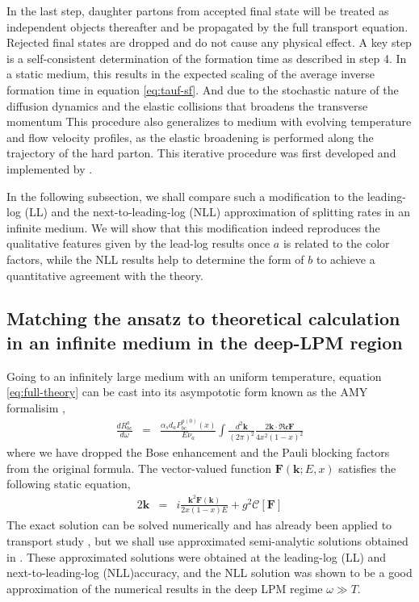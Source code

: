 \documentclass[aps, prc, reprint, amsmath, groupedaddress, nofootinbib]{revtex4-1}
\begin{document}
In the last step, daughter partons from accepted final state will be treated as independent objects thereafter and be propagated by the full transport equation.
Rejected final states are dropped and do not cause any physical effect. 
A key step is a self-consistent determination of the formation time as described in step 4. 
In a static medium, this results in the expected scaling of the average inverse formation time in equation \ref{eq:tauf-sf}.
And due to the stochastic nature of the diffusion dynamics and the elastic collisions that broadens the transverse momentum
This procedure also generalizes to medium with evolving temperature and flow velocity profiles, as the elastic broadening is performed along the trajectory of the hard parton.
This iterative procedure was first developed and implemented by \cite{Zapp:2011ya}.

In the following subsection, we shall compare such a modification to the leading-log (LL) and the next-to-leading-log (NLL) approximation of splitting rates in an infinite medium. 
We will show that this modification indeed reproduces the qualitative features given by the lead-log results once $a$ is related to the color factors, while the NLL results help to determine the form of $b$ to achieve a quantitative agreement with the theory.

\subsection{Matching the ansatz to theoretical calculation in an infinite medium in the deep-LPM region}
Going to an infinitely large medium with an uniform temperature, equation \ref{eq:full-theory} can be cast into its asympototic form known as the AMY formalisim \cite{Arnold:2002ja,Arnold:2002zm,Arnold:2003zc},
\begin{eqnarray}\label{eq:AMY-1}
\frac{dR^a_{bc}}{d\omega} &=& \frac{\alpha_s d_a P^{a(0)}_{bc}(x)}{E\nu_a} \int\frac{d^2\mathbf{k}}{(2\pi)^2} \frac{2\mathbf{k}\cdot \mathfrak{Re} \mathbf{F}}{4x^2(1-x)^2}
\end{eqnarray}
where we have dropped the Bose enhancement and the Pauli blocking factors from the original formula.
The vector-valued function $\mathbf{F}(\mathbf{k}; E, x)$ satisfies the following static equation,
\begin{eqnarray}\label{eq:AMY-2}
2\mathbf{k} &=& i\frac{\mathbf{k}^2 \mathbf{F}(\mathbf{k})}{2x(1-x)E} + g^2 \mathcal{C}[\mathbf{F}]
\end{eqnarray} 
The exact solution can be solved numerically and has already been applied to transport study \cite{Jeon:2003gi,Schenke:2009gb}, but we shall use approximated semi-analytic solutions obtained in \cite{Arnold:2008zu}.
These approximated solutions were obtained at the leading-log (LL) and next-to-leading-log (NLL)accuracy, and the NLL solution was shown to be a good approximation of the numerical results in the deep LPM regime $\omega \gg T$.
\end{document}
